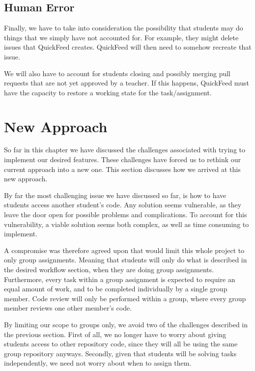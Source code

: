 
\subsection{Human Error}

Finally, we have to take into consideration the possibility that students may do things that we simply have not accounted for.
For example, they might delete issues that QuickFeed creates.
QuickFeed will then need to somehow recreate that issue.

We will also have to account for students closing and possibly merging pull requests that are not yet approved by a teacher.
If this happens, QuickFeed must have the capacity to restore a working state for the task/assignment.

\section{New Approach}

So far in this chapter we have discussed the challenges associated with trying to implement our desired features.
These challenges have forced us to rethink our current approach into a new one.
This section discusses how we arrived at this new approach.

By far the most challenging issue we have discussed so far, is how to have students access another student's code.
Any solution seems vulnerable, as they leave the door open for possible problems and complications.
To account for this vulnerability, a viable solution seems both complex, as well as time consuming to implement.

A compromise was therefore agreed upon that would limit this whole project to only group assignments.
Meaning that students will only do what is described in the desired workflow section, when they are doing group assignments.
Furthermore, every task within a group assignment is expected to require an equal amount of work, and to be completed individually by a single group member.
Code review will only be performed within a group, where every group member reviews one other member's code.

By limiting our scope to groups only, we avoid two of the challenges described in the previous section.
First of all, we no longer have to worry about giving students access to other repository code, since they will all be using the same group repository anyways.
Secondly, given that students will be solving tasks independently, we need not worry about when to assign them.

